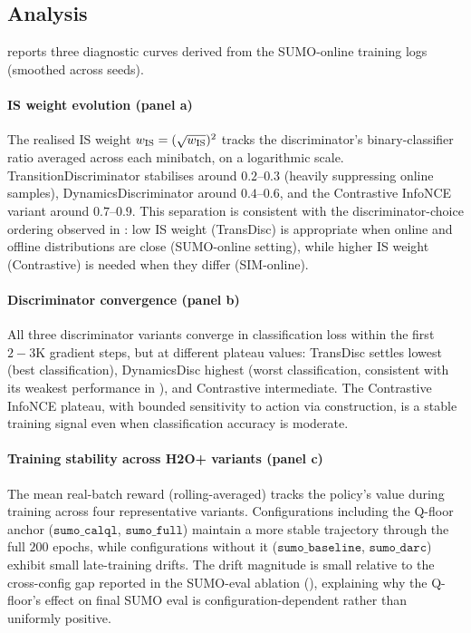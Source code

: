 \subsection{Analysis}
\label{sec:exp:analysis}

 reports three diagnostic curves derived from the SUMO-online training logs (smoothed across seeds).

\paragraph{IS weight evolution (panel a)}
The realised IS weight $w_{\mathrm{IS}} = (\sqrt{w_{\text{IS}}})^2$ tracks the discriminator's binary-classifier ratio averaged across each minibatch, on a logarithmic scale.
TransitionDiscriminator stabilises around $0.2$--$0.3$ (heavily suppressing online samples), DynamicsDiscriminator around $0.4$--$0.6$, and the Contrastive InfoNCE variant around $0.7$--$0.9$.
This separation is consistent with the discriminator-choice ordering observed in : low IS weight (TransDisc) is appropriate when online and offline distributions are close (SUMO-online setting), while higher IS weight (Contrastive) is needed when they differ (SIM-online).

\paragraph{Discriminator convergence (panel b)}
All three discriminator variants converge in classification loss within the first $2{-}3$K gradient steps, but at different plateau values: TransDisc settles lowest (best classification), DynamicsDisc highest (worst classification, consistent with its weakest performance in ), and Contrastive intermediate.
The Contrastive InfoNCE plateau, with bounded sensitivity to action via construction, is a stable training signal even when classification accuracy is moderate.

\paragraph{Training stability across H2O+ variants (panel c)}
The mean real-batch reward (rolling-averaged) tracks the policy's value during training across four representative variants.
Configurations including the Q-floor anchor ($\texttt{sumo\_calql}$, $\texttt{sumo\_full}$) maintain a more stable trajectory through the full $200$ epochs, while configurations without it ($\texttt{sumo\_baseline}$, $\texttt{sumo\_darc}$) exhibit small late-training drifts.
The drift magnitude is small relative to the cross-config gap reported in the SUMO-eval ablation (), explaining why the Q-floor's effect on final SUMO eval is configuration-dependent rather than uniformly positive.

